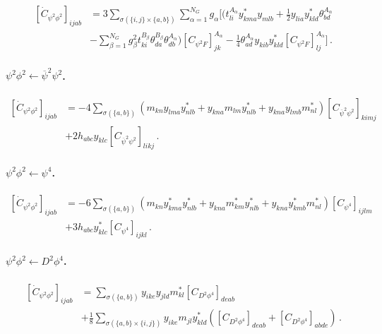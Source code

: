 \begin{align}
    \left[\dot C_{\psi^2\phi^2}\right]_{ijab} &= 3\sum_{\sigma(\{i,j\}\times\{a,b\})} \sum_{\alpha=1}^{N_G} g_\alpha \Bigg[\Bigg(t^{A_\alpha}_{li}y_{kma}^{*} y_{mlb} 
    + \frac{1}{2}y_{lia}^{\phantom *} y_{kld}^* \theta^{A_\alpha}_{bd}\nonumber\\ 
    &- \sum_{\beta=1}^{N_G} g_\beta^2 t^{B_\beta}_{ki} \theta^{B_\beta}_{da} \theta^{A_\alpha}_{db} \Bigg)\left[C_{\psi^2 F}\right]_{jk}^{A_\alpha}-\frac{1}{4} \theta_{ad}^{A_\alpha} y_{kib} y_{kld}^* \left[C_{\psi^2 F}\right]_{lj}^{A_\alpha}\Bigg]\,.\label{psi2phi2_psi2F}
\end{align}

\paragraph{\texorpdfstring{$\psi^2 \phi^2 \leftarrow \overline \psi^2 \psi^2$.}{psi2phi2frompsibar2psi2}}

\begin{align}
    \left[\dot C_{\psi^2\phi^2}\right]_{ijab} &= -4\sum_{\sigma(\{a,b\})} \left(m_{kn}y_{lma}y^*_{nlb}+y_{kna}m_{lm}y^*_{nlb}+y_{kna}y_{lmb} m^*_{nl}\right)\left[C_{\overline \psi^2 \psi^2}\right]_{kimj}
    \nonumber
    \\& +2 h_{abc}y_{klc} \left[C_{\overline \psi^2 \psi^2}\right]_{likj} \,.\label{psi2phi2_psibar2psi2}
\end{align}

\paragraph{\texorpdfstring{$\psi^2 \phi^2 \leftarrow \psi^4$.}{psi2phi2frompsi4}}

\begin{align}
    \left[\dot C_{\psi^2\phi^2}\right]_{ijab} &= -6 \sum_{\sigma(\{a,b\})}\left(m_{kn}y_{kma}^*y^*_{nlb}
    +y_{kna}m_{km}^*y^*_{nlb}+
    y_{kna}y_{kmb}^*m^*_{nl}\right)\left[C_{\psi^4}\right]_{ijlm}\nonumber\\
    &+ 3h_{abc}y^*_{klc} \left[C_{\psi^4}\right]_{ijkl}\,.
    \label{psi2phi2_psi4}
\end{align}

\paragraph{\texorpdfstring{$\psi^2 \phi^2 \leftarrow D^2\phi^4$.}{psi2phi2fromD2phi4}}

\begin{align}
    \left[\dot C_{\psi^2\phi^2}\right]_{ijab} &= \sum_{\sigma(\{a,b\})}
    y_{ike}y_{jld}m^*_{kl} \left[C_{D^2\phi^4}\right]_{deab}
    \nonumber \\&
    + \frac{1}{8} \sum_{\sigma(\{a,b\} \times \{i,j\})} y_{ike}m_{jl}y^*_{kld} \left(\left[C_{D^2\phi^4}\right]_{deab} + \left[C_{D^2\phi^4}\right]_{abde} 
    \right)\,.
    \label{psi2phi2_D2phi4}
\end{align}

